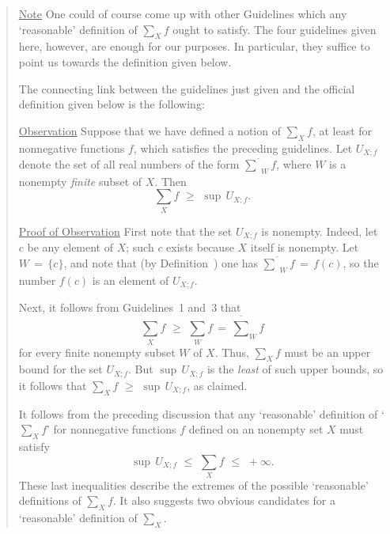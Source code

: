 \begin{quotation}
{\V

        \underline{Note} One could of course come up with other Guidelines which any `reasonable' definition of ${\sum}_{X} f$ ought to satisfy.
    The four guidelines given here, however, are enough for our purposes.
    In particular, they suffice to point us towards the definition given below.

\V
\V

         The connecting link between the guidelines just given and the official definition given below is the following:

        \underline{Observation} Suppose that we have defined a notion of ${\sum}_{X} f$, at least for nonnegative functions $f$,
    which satisfies the preceding guidelines.
    Let $U_{X;f}$ denote the set of all real numbers of the form $\overline{{\sum}}_{W} f$, where $W$ is a nonempty {\em finite} subset of $X$.
    Then
        \begin{displaymath}
        {\sum}_{X} f \,\,{\geq}\,\,{\sup}\,U_{X;f}.
        \end{displaymath}

\V

        \underline{Proof of Observation} First note that the set $U_{X;f}$ is nonempty.
    Indeed, let $c$ be any element of $X$;
    such $c$ exists because $X$ itself is nonempty.
    Let $W \,=\, \{c\}$, and note that (by Definition~) one has $\overline{{\sum}}_{W} f\,=\, f(c)$, so the number $f(c)$ is an element of $U_{X;f}$.

    Next, it follows from Guidelines~1 and~3 that 
        \begin{displaymath}
        {\sum}_{X} f\,\,{\geq}\,\,{\sum}_{W} f \,=\, \overline{{\sum}}_{W} f
        \end{displaymath}
    for every finite nonempty subset $W$ of $X$.
    Thus, ${\sum}_{X} f$ must be an upper bound for the set $U_{X;f}$.
    But ${\sup}\,U_{X;f}$ is the {\em least} of such upper bounds, so it follows that ${\sum}_{X} f\,\,{\geq}\,\,{\sup}\,U_{X;f}$, as claimed.

\V
\V

        It follows from the preceding discussion that any `reasonable' definition of `${\sum}_{X} f$' for nonnegative functions $f$ defined on an nonempty set $X$ must satisfy
        \begin{displaymath}
        {\sup}\,U_{X;f}\,\,{\leq}\,\,{\sum}_{X} f\,\,{\leq}\,\,+{\infty}.
        \end{displaymath}
    These last inequalities  describe the extremes of the possible `reasonable' definitions of ${\sum}_{X} f$.
    It also suggests two obvious candidates for a `reasonable' definition of ${\sum}_{X}$.

}
\end{quotation}

